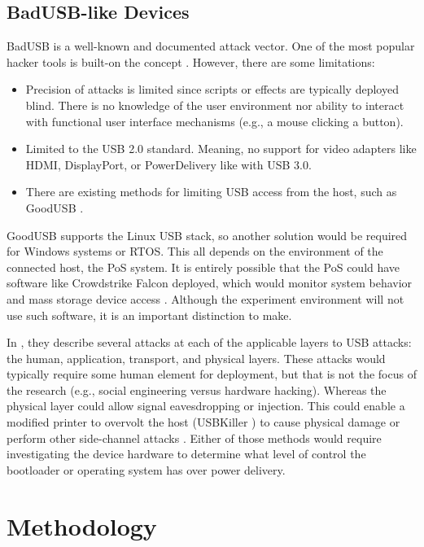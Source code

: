 \documentclass[conference]{IEEEtran}
\begin{document}
\subsection{BadUSB-like Devices}
BadUSB is a well-known and documented attack vector. One of the most popular hacker tools is built-on the concept \autocite{hak5BashBunny}. However, there are some limitations:

\begin{itemize}
  \item Precision of attacks is limited since scripts or effects are typically deployed blind. There is no knowledge of the user environment nor ability to interact with functional user interface mechanisms (e.g., a mouse clicking a button). 
  \item Limited to the USB 2.0 standard. Meaning, no support for video adapters like HDMI, DisplayPort, or PowerDelivery like with USB 3.0. 
  \item There are existing methods for limiting USB access from the host, such as GoodUSB \autocite{tianDefendingMaliciousUSB2015}.
\end{itemize}

GoodUSB supports the Linux USB stack, so another solution would be required for Windows systems or RTOS. This all depends on the environment of the connected host, the PoS system. It is entirely possible that the PoS could have software like Crowdstrike Falcon deployed, which would monitor system behavior and mass storage device access \autocite{backer2021sdn}. Although the experiment environment will not use such software, it is an important distinction to make.

In \autocite*{tianSoKPlugPray2018}, they describe several attacks at each of the applicable layers to USB attacks: the human, application, transport, and physical layers. These attacks would typically require some human element for deployment, but that is not the focus of the research (e.g., social engineering versus hardware hacking). Whereas the physical layer could allow signal eavesdropping or injection. This could enable a modified printer to overvolt the host (USBKiller \autocite{USBKillDevices}) to cause physical damage or perform other side-channel attacks \autocite*{sridharEMIIssuesUniversal2003}. Either of those methods would require investigating the device hardware to determine what level of control the bootloader or operating system has over power delivery.


\section*{Methodology}
\end{document}
